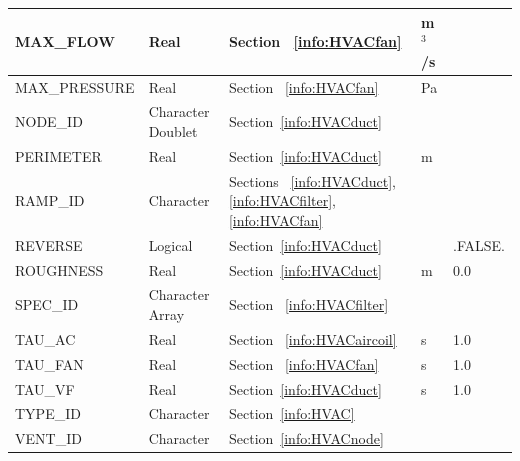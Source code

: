 \documentclass[11pt]{book}
\begin{document}
\begin{longtable}{@{\extracolsep{\fill}}|l|l|l|l|l|}
{\ct MAX\_FLOW}                 & Real              & Section ~\ref{info:HVACfan}                                                   &  m$^3$/s      &                \\ \hline
{\ct MAX\_PRESSURE}             & Real              &  Section ~\ref{info:HVACfan}                                                  &  Pa           &                \\ \hline
{\ct NODE\_ID}                  & Character Doublet & Section~\ref{info:HVACduct}                                                   &               &                \\ \hline
{\ct PERIMETER}                 & Real              & Section~\ref{info:HVACduct}                                                   &  m            &                \\ \hline
{\ct RAMP\_ID}                  & Character         & Sections ~\ref{info:HVACduct}, \ref{info:HVACfilter}, \ref{info:HVACfan}      &               &                \\ \hline
{\ct REVERSE}                   & Logical           & Section~\ref{info:HVACduct}                                                   &               & {\ct .FALSE.}  \\ \hline
{\ct ROUGHNESS}                 & Real              & Section~\ref{info:HVACduct}                                                   &  m            & 0.0            \\ \hline
{\ct SPEC\_ID}                  & Character Array   & Section ~\ref{info:HVACfilter}                                                &               &                \\ \hline
{\ct TAU\_AC}                   & Real              & Section ~\ref{info:HVACaircoil}                                               & s             & 1.0            \\ \hline
{\ct TAU\_FAN}                  & Real              & Section ~\ref{info:HVACfan}                                                   & s             & 1.0            \\ \hline
{\ct TAU\_VF}                   & Real              & Section~\ref{info:HVACduct}                                                   & s             & 1.0            \\ \hline
{\ct TYPE\_ID}                  & Character         & Section~\ref{info:HVAC}                                                       &               &                \\ \hline
{\ct VENT\_ID}                  & Character         & Section~\ref{info:HVACnode}                                                   &               &                \\ \hline

\end{longtable}
\end{document}
